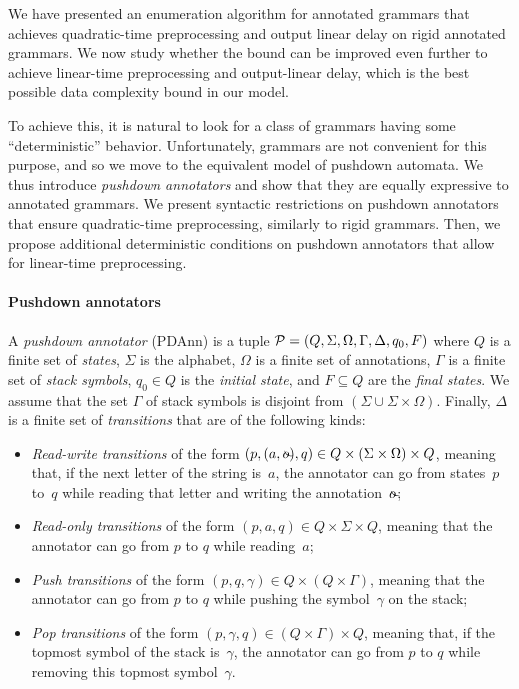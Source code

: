 %
%

We have presented an enumeration algorithm for annotated grammars that achieves
quadratic-time preprocessing and output linear delay on rigid annotated
grammars. We now study whether the bound can be improved even further to achieve
linear-time preprocessing and output-linear delay, which is the best possible
data complexity bound in our model.

To achieve this, it is natural to look for a class of grammars having some ``deterministic'' behavior.
Unfortunately, grammars are not convenient for this purpose, and so we move to
the equivalent model of pushdown automata.
We thus introduce \emph{pushdown annotators} and show that they are equally expressive to annotated grammars.
We present syntactic restrictions on pushdown annotators that ensure
quadratic-time preprocessing, similarly to rigid grammars.
%
Then, we propose additional deterministic conditions on pushdown annotators that allow for linear-time preprocessing.
%

\paragraph{Pushdown annotators} A \emph{pushdown annotator} (PDAnn) is a tuple
$\mathcal{P} = (Q, \Sigma, \Omega, \Gamma, \Delta, \allowbreak q_0, F)$ where $Q$ is a finite set of \emph{states},
%
%
$\Sigma$ is the alphabet, $\Omega$ is a finite set of annotations, $\Gamma$ is a finite set of \emph{stack symbols}, $q_0 \in Q$ is the \emph{initial state}, and $F \subseteq Q$ are the \emph{final states}. We assume that the set $\Gamma$ of stack symbols is disjoint from $(\Sigma \cup \Sigma\times \Omega)$. Finally, $\Delta$ is a finite set of \emph{transitions} that are of the following kinds:
%
\begin{itemize}
	\item {\em Read-write transitions} of the form $(p, (a, \oout), q) \in Q\times(\Sigma\times \Omega)\times Q$, meaning that, if the next letter of the string is~$a$, the annotator can go from states~$p$ to~$q$ while reading that letter and writing the annotation~$\oout$;
	\item {\em Read-only transitions} of the form $(p, a, q) \in
          Q\times\Sigma\times Q$, meaning that the annotator can go from $p$ to
          $q$ while reading~$a$;
	\item {\em Push transitions} of the form $(p, q, \gamma) \in Q\times (Q\times\Gamma)$, meaning that the annotator can go from $p$ to $q$ while pushing the symbol~$\gamma$ on the stack;
	\item {\em Pop transitions} of the form $(p, \gamma, q) \in (Q\times \Gamma)\times Q$, meaning that, if the topmost symbol of the stack is~$\gamma$, the annotator can go from $p$ to $q$ while removing this topmost symbol~$\gamma$.
\end{itemize}

